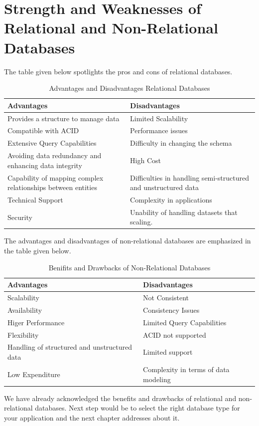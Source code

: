 \documentclass[a4Paper,12pt]{report}
\begin{document}
\section{Strength and Weaknesses of Relational and Non-Relational Databases}
The table given below spotlights the pros and cons of relational databases.
\begin{table}[H]
\centering
\begin{tabularx}{\textwidth}{XX}\hline
Advantages & Disadvantages\\\hline
Provides a structure to manage data & Limited Scalability\\
Compatible with ACID & Performance issues\\
Extensive Query Capabilities & Difficulty in changing the schema\\
Avoiding data redundancy and enhancing data integrity & High Cost\\
Capability of mapping complex relationships between entities & Difficulties in handling semi-structured and unstructured data\\
Technical Support & Complexity in applications\\
Security & Unability of handling datasets that scaling.\\\hline
\end{tabularx}
\caption{Advantages and Disadvantages Relational Databases}
\end{table}
The advantages and disadvantages of non-relational databases are emphasized in the table given below.
\begin{table}[H]
\centering
\begin{tabularx}{\textwidth}{XX}\hline
Advantages & Disadvantages\\\hline
Scalability & Not Consistent\\
Availability & Consistency Issues\\
Higer Performance & Limited Query Capabilities\\
Flexibility & ACID not supported\\
Handling of structured and unstructured data & Limited support\\
Low Expenditure & Complexity in terms of data modeling\\\hline
\end{tabularx}
\caption{Benifits and Drawbacks of Non-Relational Databases}
\end{table}
We have already acknowledged the benefits and drawbacks of relational and non-relational databases. Next step would be to select the right database type for your application and the next chapter addresses about it.
\end{document}
